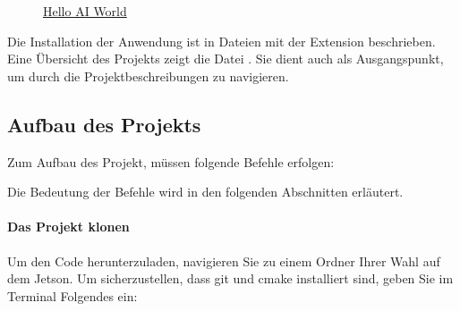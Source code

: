 \begin{figure}
	
	\caption[Hello AI World]{\href{https://github.com/dusty-nv/jetson-inference}{Hello AI World  \cite{JetsonHelloWorld:2020}}}
\end{figure}

Die Installation der Anwendung ist in Dateien mit der Extension  beschrieben.
Eine Übersicht des Projekts zeigt die Datei . Sie dient auch als Ausgangspunkt, um durch die Projektbeschreibungen zu navigieren.

\subsection{Aufbau des Projekts}

Zum Aufbau des Projekt, müssen folgende Befehle erfolgen:

 \newline
{} \newline
{} \newline
{} \newline
{} \newline
{} \newline
{} \newline
{} \newline
{} \newline
{} \newline

Die Bedeutung der Befehle wird in den folgenden Abschnitten erläutert.

\paragraph{Das Projekt klonen}
Um den Code herunterzuladen, navigieren Sie zu einem Ordner Ihrer Wahl auf dem Jetson. Um sicherzustellen, dass git und cmake installiert sind, geben Sie im Terminal Folgendes ein:

\medskip

 \newline
{}

